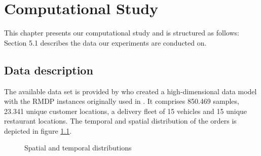 \chapter{Computational Study}

This chapter presents our computational study and is structured as follows: Section 5.1 describes the data our experiments are conducted on.  
\section{Data description}

The available data set is provided by \cite{Hildebrandt2020_EAT} who created a high-dimensional data model with the RMDP instances originally used in \cite{UlmerRMDP}. It comprises 850.469 samples, 23.341 unique customer locations, a delivery fleet of 15 vehicles and 15 unique restaurant locations. The temporal and spatial distribution of the orders is depicted in figure \ref{fig:dists}. 
\begin{figure}[h]
	\centering
	\caption{Spatial and temporal distributions}
	\label{fig:dists}
\end{figure}

